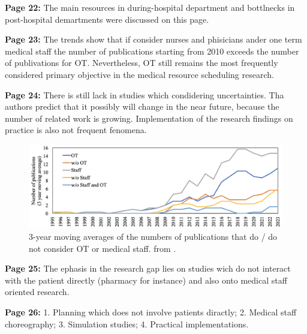     \textbf{Page 22:}
    The main resources in during-hospital department and bottlnecks in post-hospital demartments were discussed on this page.
    
    \textbf{Page 23:}
    The trends show that if consider nurses and phisicians ander one term medical staff the number of publications starting from 2010 exceeds the number of publivations for OT. Nevertheless, OT still remains the most frequently considered primary objective in the medical resource scheduling research.
    
    \textbf{Page 24:}
    There is still lack in studies which condidering uncertainties. Tha authors predict that it possibly will change in the near future, because the number of related work is growing. Implementation of the research findings on practice is also not frequent fenomena.
    \begin{figure}[H]
        \centering
        \includegraphics[width=1\textwidth]{figures/SR0010NL23/fig10.png}
        \caption{3-year moving averages of the numbers of publications that do / do not consider OT or medical staff. from \cite{x338}.}
        \label{fig10:SR0010NL23}
    \end{figure}

    \textbf{Page 25:}
    The ephasis in the research gap lies on studies wich do not interact with the patient directly (pharmacy for instance) and also onto medical staff oriented research.

    \textbf{Page 26:}
        1. Planning which does not involve patients diractly; 2. Medical staff choreography; 3. Simulation studies; 4. Practical implementations.